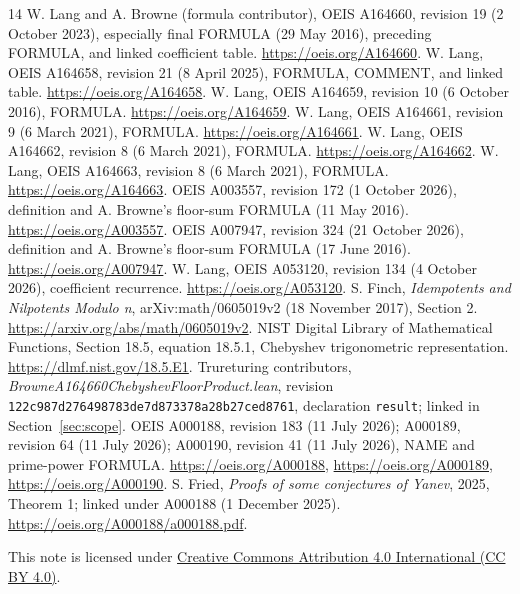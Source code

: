 \documentclass[11pt]{article}
\begin{document}
\begin{thebibliography}{14}\small
{} W. Lang and A. Browne (formula contributor),
OEIS A164660, revision 19 (2 October 2023), especially final FORMULA
(29 May 2016), preceding FORMULA, and linked coefficient table.
\url{https://oeis.org/A164660}.
 W. Lang, OEIS A164658, revision 21 (8 April 2025),
FORMULA, COMMENT, and linked table.
\url{https://oeis.org/A164658}.
 W. Lang, OEIS A164659, revision 10 (6 October 2016),
FORMULA. \url{https://oeis.org/A164659}.
 W. Lang, OEIS A164661, revision 9 (6 March 2021),
FORMULA. \url{https://oeis.org/A164661}.
 W. Lang, OEIS A164662, revision 8 (6 March 2021),
FORMULA. \url{https://oeis.org/A164662}.
 W. Lang, OEIS A164663, revision 8 (6 March 2021),
FORMULA. \url{https://oeis.org/A164663}.
 OEIS A003557, revision 172 (1 October 2026),
definition and A. Browne's floor-sum FORMULA (11 May 2016).
\url{https://oeis.org/A003557}.
 OEIS A007947, revision 324 (21 October 2026),
definition and A. Browne's floor-sum FORMULA (17 June 2016).
\url{https://oeis.org/A007947}.
 W. Lang, OEIS A053120, revision 134
(4 October 2026), coefficient recurrence.
\url{https://oeis.org/A053120}.
 S. Finch, \emph{Idempotents and Nilpotents Modulo n},
arXiv:math/0605019v2 (18 November 2017), Section 2.
\url{https://arxiv.org/abs/math/0605019v2}.
 NIST Digital Library of Mathematical Functions,
Section 18.5, equation 18.5.1, Chebyshev trigonometric representation.
\url{https://dlmf.nist.gov/18.5.E1}.
 Trureturing contributors,
\emph{BrowneA164660ChebyshevFloorProduct.lean}, revision
\texttt{122c987d276498783de7d873378a28b27ced8761}, declaration
\texttt{result}; linked in Section~\ref{sec:scope}.
 OEIS A000188, revision 183 (11 July 2026);
A000189, revision 64 (11 July 2026); A000190, revision 41
(11 July 2026), NAME and prime-power FORMULA.
\url{https://oeis.org/A000188}, \url{https://oeis.org/A000189},
\url{https://oeis.org/A000190}.
 S. Fried, \emph{Proofs of some conjectures of Yanev},
2025, Theorem 1; linked under A000188 (1 December 2025).
\url{https://oeis.org/A000188/a000188.pdf}.
\end{thebibliography}
\medskip\noindent\small
This note is licensed under
\href{https://creativecommons.org/licenses/by/4.0/}{Creative Commons
Attribution 4.0 International (CC BY 4.0)}.
\end{document}
